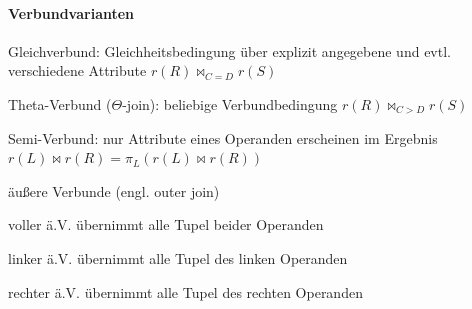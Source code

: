 \documentclass[a4paper]{article}
\begin{document}
\begin{multicols}{3}
    \paragraph{Verbundvarianten}
    \begin{itemize*}
        \item Gleichverbund: Gleichheitsbedingung über explizit angegebene und evtl. verschiedene Attribute $r(R) \bowtie_{C=D} r(S)$
        \item Theta-Verbund ($\Theta$-join): beliebige Verbundbedingung $r(R) \bowtie_{C>D} r(S)$
        \item Semi-Verbund: nur Attribute eines Operanden erscheinen im Ergebnis $r(L) \bowtie r(R) = \pi_L (r(L) \bowtie r(R))$
        \item äußere Verbunde (engl. outer join)
        \begin{itemize*}
            \item voller ä.V. übernimmt alle Tupel beider Operanden
            \item linker ä.V. übernimmt alle Tupel des linken Operanden
            \item rechter ä.V. übernimmt alle Tupel des rechten Operanden
        \end{itemize*}
    \end{itemize*}


\end{multicols}
\end{document}
